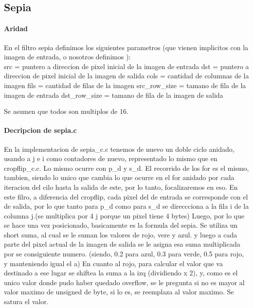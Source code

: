 \documentclass[a4paper]{article}
\begin{document}
     
          
     
     
     
     
      
       
      


 
	  
	 
\subsection{Sepia}

\paragraph{\textbf{Aridad}}
\hfill \break
En el filtro sepia definimos los  siguientes parametros (que vienen implicitos con la imagen de entrada, o nosotros definimos ):
\hfill \break
\\
src = puntero a direccion de pixel inicial de la imagen de entrada
\hfill \break
dst = puntero a direccion de pixel inicial de la imagen de salida
\hfill \break
cols = cantidad de columnas de la imagen
fils = cantidad de filas de la imagen
src_row_size = tamano de fila de la imagen de entrada
dst_row_size = tamano de fila de la imagen de salida 

Se asumen que todos son multiplos de 16.

\paragraph{\textbf{Decripcion de sepia.c}}
\hfill \break
 	En la implementacion de sepia_c.c tenemos de nuevo un doble ciclo anidado, usando a j e i como contadores de nuevo, representado lo mismo que en cropflip_c.c. Lo mismo ocurre con p_d y s_d. El recorrido de los for es el mismo, tambien, siendo lo unico que cambia lo que ocurre en el for anidado por cada iteracion del cilo hasta la salida de este, por lo tanto, focalizaremos en eso.
 	\hfill \break
 	En este filro, a diferencia del cropflip, cada pixel del de entrada se corresponde con el de salida, por lo que tanto para p_d como para s_d se direccciona a la fila i de la columna j.(se multiplica por 4 j porque un pixel tiene 4 bytes)
 	\hfill \break
 	Luego, por lo que se hace una vez posicionado, basicamente es la formula del sepia. Se utiliza un short suma, al cual se le suman los valores de rojo, vere y azul. y luego a cada parte del pixel actual de la imagen de salida se le asigna esa suma multiplicada por se consiguiente numero. (siendo, 0.2 para azul, 0.3 para verde, 0.5 para rojo, y manteniendo igual el a)
 	\hfill \break
 	En cuanto al rojo, para calcular el valor que va destinado a ese lugar se shiftea la suma a la izq (dividiendo x 2), y, como es el unico valor donde pudo haber quedado overflow, se le pregunta si no es mayor al valor maximo de unsigned de byte, si lo es, se reemplaza al valor maximo. Se satura el valor.
 	\hfill \break
 	
\end{document}
